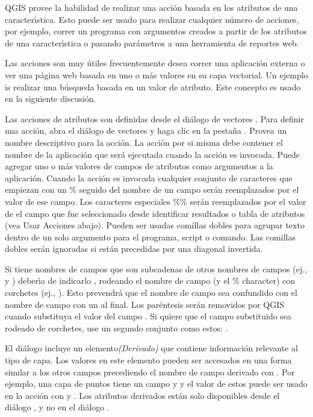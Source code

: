 QGIS provee la habilidad de realizar una acci\'on basada en los atributos de una
caracter\'{\i}stica. Esto puede ser usado para realizar cualquier n\'umero de acciones, por ejemplo,
correr un programa con argumentos creados a partir de los atributos de una caracter\'{\i}stica o
pasando par\'ametros a una herramienta de reportes web.

Las acciones son muy \'utiles frecuentemente desea correr una aplicaci\'on externa o ver
una p\'agina web basada en uno o más valores en su capa vectorial. Un ejemplo
is realizar una b\'usqueda basada en un valor de atributo. Este concepto es usado en la  
siguiente discusi\'on.


Las acciones de atributos son definidas desde el di\'alogo de vectores . Para definir una
acci\'on, abra el di\'alogo de vectores  y haga clic en la
pesta\~na . Provea un nombre descriptivo para la acci\'on. La acci\'on por si misma
debe contener el nombre de la aplicaci\'on que ser\'a ejecutada cuando la acci\'on es invocada.
Puede agregar uno o más valores de campos de atributos como argumentos
a la aplicaci\'on. Cuando la acci\'on es invocada cualquier conjunto de caracteres que empiezan
con un \% seguido del nombre de un campo ser\'an reemplazados por el valor de ese campo.
Los caracteres especiales \%\% \index{\%\%}ser\'an reemplazados por el valor
de el campo que fue seleccionado desde identificar resultados o tabla de atributos (vea
Usar Acciones abajo).  Pueden ser usadas comillas dobles para agrupar texto dentro
de un solo argumento para el programa, script o comando. Las comillas dobles ser\'an ignoradas
si est\'an precedidas por una diagonal invertida.

Si tiene nombres de campos que son subcadenas de otros nombres de campos (ej., 
y ) deber\'{\i}a de indicarlo
, rodeando el nombre de campo (y el \% character) con 
corchetes (ej., \usertext{[\%col10]}). Esto prevendr\'a que el nombre de campo 
sea confundido con el nombre de campo  con un 
al final. Los par\'entesis ser\'an removidos por QGIS cuando substituya el valor del campo
. Si quiere que el campo substituido sea rodeado de corchetes,
use un segundo conjunto como estos: \usertext{[[\%col10]]}.

El di\'alogo  incluye un elemento{\em (Derivado)} que
contiene informaci\'on relevante al tipo de capa. Los valores
en este elemento pueden ser accesados en una forma similar a los otros campos
precediendo el nombre de campo derivado  con . Por
ejemplo, una capa de puntos tiene un campo  y  y el
valor de estos puede ser usado en la acci\'on con  y
. Los atributos derivados est\'an solo disponibles desde el di\'alogo
, y no en el di\'alogo .

